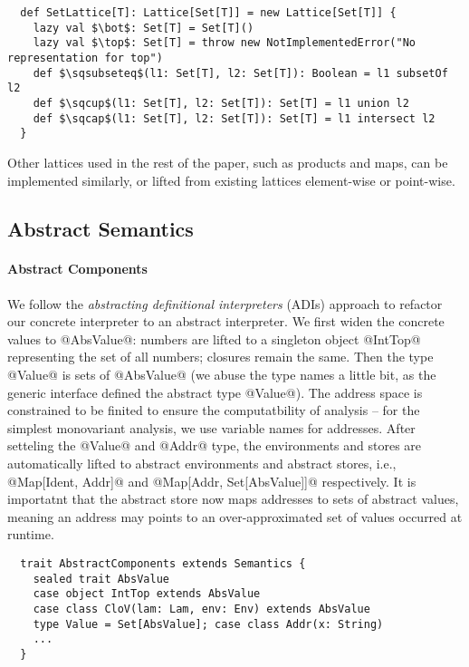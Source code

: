 \begin{lstlisting}
  def SetLattice[T]: Lattice[Set[T]] = new Lattice[Set[T]] {
    lazy val $\bot$: Set[T] = Set[T]()
    lazy val $\top$: Set[T] = throw new NotImplementedError("No representation for top")
    def $\sqsubseteq$(l1: Set[T], l2: Set[T]): Boolean = l1 subsetOf l2
    def $\sqcup$(l1: Set[T], l2: Set[T]): Set[T] = l1 union l2
    def $\sqcap$(l1: Set[T], l2: Set[T]): Set[T] = l1 intersect l2
  }
\end{lstlisting}

Other lattices used in the rest of the paper, such as products and maps, can be
implemented similarly, or lifted from existing lattices element-wise or point-wise.

\subsection{Abstract Semantics}

\paragraph{Abstract Components}


We follow the \textit{abstracting definitional interpreters} (ADIs) approach
\cite{DBLP:journals/pacmpl/DaraisLNH17} to refactor our concrete interpreter to
an abstract interpreter. We first widen the concrete values to @AbsValue@: numbers
are lifted to a singleton object @IntTop@ representing the set of all numbers;
closures remain the same. Then the type @Value@ is sets of @AbsValue@ (we abuse
the type names a little bit, as the generic interface defined the abstract type
@Value@).
The address space is constrained to be finited to ensure the computatbility of
analysis -- for the simplest monovariant analysis, we use variable names for
addresses. After setteling the @Value@ and @Addr@ type, the environments and
stores are automatically lifted to abstract environments and abstract stores,
i.e., @Map[Ident, Addr]@ and @Map[Addr, Set[AbsValue]]@ respectively.
It is importatnt that the abstract store now maps addresses to sets of abstract
values, meaning an address may points to an over-approximated set of values
occurred at runtime.

\begin{lstlisting}
  trait AbstractComponents extends Semantics {
    sealed trait AbsValue
    case object IntTop extends AbsValue
    case class CloV(lam: Lam, env: Env) extends AbsValue
    type Value = Set[AbsValue]; case class Addr(x: String)
    ...
  }
\end{lstlisting}

